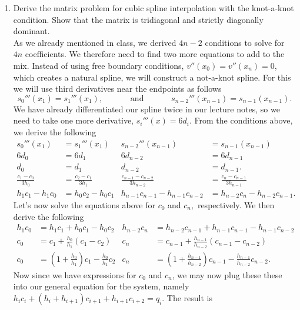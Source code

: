 \documentclass{article}
\begin{document}
\begin{enumerate}[label = {\arabic*}]
		\item Derive the matrix problem for cubic spline interpolation with the knot-a-knot condition. Show that the matrix is tridiagonal and strictly diagonally dominant. \\
		
		\hspace{15pt} As we already mentioned in class, we derived $4n - 2$ conditions to solve for $4n$ coefficients. We therefore need to find two more equations to add to the mix. Instead of using free boundary conditions, $v''(x_0) = v''(x_n) = 0$, which creates a natural spline, we will construct a not-a-knot spline. For this we will use third derivatives near the endpoints as follows \[s_0'''(x_1) = s_1'''(x_1), \quad \quad \quad \text{ and } \quad \quad \quad s_{n - 2}'''(x_{n - 1}) = s_{n - 1}(x_{n - 1}).\] We have already differentiated our spline twice in our lecture notes, so we need to take one more derivative, $s_i'''(x) = 6d_i.$ From the conditions above, we derive the following
		\begin{align*}
			s_0'''(x_1)  &= s_1'''(x_1) & s_{n - 2}'''(x_{n - 1}) &= s_{n - 1}(x_{n - 1}) \\
				  6d_0   &= 	  6d_1  & 			  6d_{n - 2}  &= 6d_{n - 1} 		  \\
				   d_0 	 &= 	   d_1  & 			   d_{n - 2}  &= d_{n - 1}.			  \\
			\frac{c_1 - c_0}{3h_0} &= \frac{c_2 - c_1}{3h_1} & \frac{c_{n - 1} - c_{n - 2}}{3h_{n - 2}} &= \frac{c_n - c_{n - 1}}{3h_{n - 1}} \\
			h_1c_1 - h_1c_0 &= h_0c_2 - h_0c_1 & h_{n - 1}c_{n - 1} - h_{n - 1}c_{n - 2} &= h_{n - 2}c_n - h_{n - 2}c_{n - 1}.
		\end{align*}
		Let's now solve the equations above for $c_0$ and $c_n,$ respectively. We then derive the following
		\begin{align*}
			h_1c_0 &= h_1c_1 + h_0c_1 - h_0c_2  & h_{n - 2}c_n &= h_{n - 2}c_{n - 1} + h_{n - 1}c_{n - 1} - h_{n - 1}c_{n - 2} \\
			c_0 &= c_1 + \frac{h_0}{h_1}(c_1 - c_2) & c_n &= c_{n - 1} + \frac{h_{n - 1}}{h_{n - 2}}(c_{n - 1} - c_{n - 2}) \\
			c_0 &= \left(1 + \frac{h_0}{h_1}\right)c_1 - \frac{h_0}{h_1}c_2 & c_n &= \left(1 + \frac{h_{n - 1}}{h_{n - 2}}\right) c_{n - 1} - \frac{h_{n - 1}}{h_{n - 2}}c_{n - 2}.
		\end{align*}
		Now since we have expressions for $c_0$ and $c_n$, we may now plug these these into our general equation for the system, namely $h_ic_i + (h_i + h_{i + 1})c_{i + 1} + h_{i + 1}c_{i + 2} = q_i$. The result is

\end{enumerate}
\end{document}
